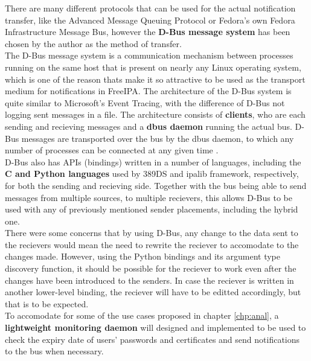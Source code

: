 There are many different protocols that can be used for the actual notification transfer, like the Advanced Message Queuing Protocol or Fedora's own Fedora Infrastructure Message Bus,
however the \textbf{D-Bus message system} has been chosen by the author as the method of transfer.\\
The D-Bus message system is a communication mechanism between processes running on the same host that is present on nearly any Linux operating system,
which is one of the reason thats make it so attractive to be used as the transport medium for notifications in FreeIPA.
The architecture of the D-Bus system is quite similar to Microsoft's Event Tracing, with the difference of D-Bus not logging sent messages in a file.
The architecture consists of \textbf{clients}, who are each sending and recieving messages and a \textbf{dbus daemon} running the actual bus.
D-Bus messages are transported over the bus by the dbus daemon, to which any number of processes can be connected at any given time \cite{dbusWeb}. \\
D-Bus also has APIs (bindings) written in a number of languages, including the \textbf{C and Python languages} used by 389DS and ipalib framework, respectively, for both the sending and recieving side.
Together with the bus being able to send messages from multiple sources, to multiple recievers, this allows D-Bus to be used with any of previously mentioned sender placements, including the hybrid one. \\
There were some concerns that by using D-Bus, any change to the data sent to the recievers would mean the need to rewrite the reciever to accomodate to the changes made.
However, using the Python bindings and its argument type discovery function, it should be possible for the reciever to work even after the changes have been introduced to the senders.
In case the reciever is written in another lower-level binding, the reciever will have to be editted accordingly, but that is to be expected. \\
To accomodate for some of the use cases proposed in chapter \ref{chp:anal}, a \textbf{lightweight monitoring daemon} will designed and implemented to be used to check the expiry date of users' passwords and certificates
and send notifications to the bus when necessary. \\


